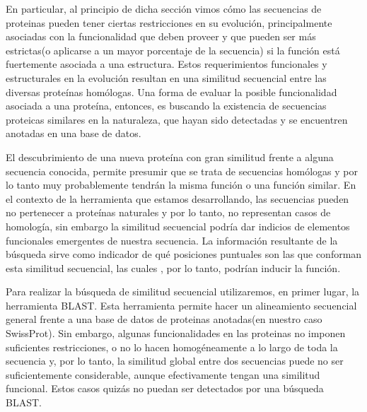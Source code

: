En particular, al principio de dicha sección vimos cómo las secuencias de proteinas pueden tener ciertas restricciones en su evolución, principalmente asociadas 
con la funcionalidad que deben proveer y que pueden ser más estrictas(o aplicarse a un mayor porcentaje de la secuencia) si la función está fuertemente asociada a una estructura.
Estos requerimientos funcionales y estructurales en la evolución resultan en una similitud secuencial entre las diversas proteínas homólogas.
Una forma de evaluar la posible funcionalidad asociada a una proteína, entonces, es buscando la existencia de secuencias proteicas similares en la naturaleza, que hayan sido detectadas y se encuentren anotadas en una base de datos.

El descubrimiento de una nueva proteína con gran similitud frente a alguna secuencia conocida, permite presumir que se trata de secuencias homólogas y por lo tanto muy probablemente tendrán la misma función o una función similar. 
En el contexto de la herramienta que estamos desarrollando, las secuencias pueden no pertenecer a proteínas naturales y por lo tanto, no representan casos de homología, sin embargo la similitud secuencial podría dar indicios de elementos funcionales emergentes de nuestra secuencia. La información resultante de la búsqueda sirve como indicador de qué posiciones puntuales son las que conforman esta similitud secuencial, las cuales , por lo tanto, podrían inducir la función. 


Para realizar la búsqueda de similitud secuencial utilizaremos, en primer lugar, la herramienta BLAST. 
Esta herramienta permite hacer un alineamiento secuencial general frente a una base de datos de proteinas anotadas(en nuestro caso SwissProt).
Sin embargo, algunas funcionalidades en las proteinas no imponen suficientes restricciones, o no lo hacen homogéneamente a lo largo de toda la secuencia y, por lo tanto, 
la similitud global entre dos secuencias puede no ser suficientemente considerable, aunque efectivamente tengan una similitud funcional. 
Estos casos quizás no puedan ser detectados por una búsqueda BLAST. 


